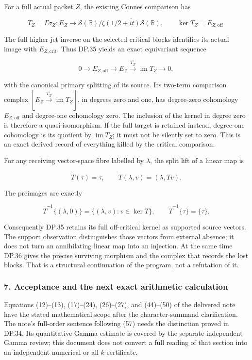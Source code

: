 For a full actual packet \(Z\), the existing Connes comparison has

\[
T_Z=\Gamma\sigma_Z:E_Z\longrightarrow
\mathcal S(\mathbb R)/\overline{\zeta(1/2+it)\mathcal S(\mathbb R)},
\qquad \ker T_Z=E_{Z,\mathrm{off}}.
\tag{DP.35}
\]

The full higher-jet inverse on the selected critical blocks identifies its actual image with \(E_{Z,\mathrm{crit}}\). Thus DP.35 yields an exact equivariant sequence

\[
0\longrightarrow E_{Z,\mathrm{off}}
\longrightarrow E_Z\xrightarrow{T_Z}\operatorname{im}T_Z
\longrightarrow0,
\tag{DP.36}
\]

with the canonical primary splitting of its source. Its two-term comparison complex \([E_Z\xrightarrow{T_Z}\operatorname{im}T_Z]\), in degrees zero and one, has degree-zero cohomology \(E_{Z,\mathrm{off}}\) and degree-one cohomology zero. The inclusion of the kernel in degree zero is therefore a quasi-isomorphism. If the full target is retained instead, degree-one cohomology is its quotient by \(\operatorname{im}T_Z\); it must not be silently set to zero. This is an exact derived record of everything killed by the critical comparison.

For any receiving vector-space fibre labelled by \(\lambda\), the split lift of a linear map is

\[
\widetilde T(\tau)=\tau,
\qquad \widetilde T(\lambda,v)=(\lambda,Tv).
\tag{DP.37}
\]

The preimages are exactly

\[
\widetilde T^{-1}\{(\lambda,0)\}
=\{(\lambda,v):v\in\ker T\},
\qquad \widetilde T^{-1}\{\tau\}=\{\tau\}.
\tag{DP.38}
\]

Consequently DP.35 retains its full off-critical kernel as supported source vectors. The support observation distinguishes those vectors from external absence; it does not turn an annihilating linear map into an injection. At the same time DP.36 gives the precise surviving morphism and the complex that records the lost blocks. That is a structural continuation of the program, not a refutation of it.

\subsubsection{7. Acceptance and the next exact arithmetic calculation}\label{endpoint-purity_review--acceptance-and-the-next-exact-arithmetic-calculation}

Equations (12)--(13), (17)--(24), (26)--(27), and (44)--(50) of the delivered note have the stated mathematical scope after the character-summand clarification. The note's full-order sentence following (57) needs the distinction proved in DP.34. Its quantitative Gamma estimate is covered by the separate independent Gamma review; this document does not convert a full reading of that section into an independent numerical or all-\(k\) certificate.

